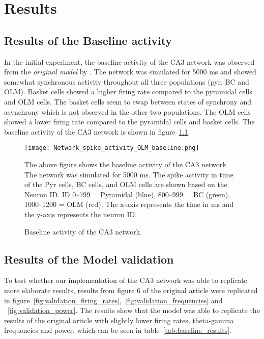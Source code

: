 \chapter{Results}


\section{Results of the Baseline activity}
In the initial experiment, the baseline activity of the CA3 network was
observed from the \textit{original model} by
\textcite{sanjayImpairedDendriticInhibition2015}. The network was simulated for
5000 ms and showed somewhat synchronous activity throughout all three
populations (pyr, BC and OLM). Basket cells showed a higher firing rate
compared to the pyramidal cells and OLM cells. The basket cells seem to swap
between states of synchrony and asynchrony which is not observed in the other
two populations. The OLM cells showed a lower firing rate compared to the
pyramidal cells and basket cells. The baseline activity of the CA3 network is
shown in figure~\ref{fig:baseline_activity}.

\begin{figure}[htbp]
    \centering
    \texttt{[image: Network\_spike\_activity\_OLM\_baseline.png]}
    \caption[Baseline activity of the CA3 network]{Baseline activity of the CA3 network.}\label{fig:baseline_activity}
    \begin{minipage}{0.9\textwidth}
        The above figure shows the baseline activity of the CA3 network. The network was simulated for 5000 ms. The spike activity in time of the Pyr cells, BC cells, and OLM cells are shown based on the Neuron ID\@. ID 0--799 = Pyramidal (blue), 800--999 = BC (green), 1000--1200 = OLM (red). The x-axis represents the time in ms and the y-axis represents the neuron ID\@.
    \end{minipage}
\end{figure}

\section{Results of the Model validation}
To test whether our implementation of the CA3 network was able to replicate
more elaborate results, results from figure 6 of the original
\textcite{sanjayImpairedDendriticInhibition2015} article were replicated in
figure~\ref{fig:validation_firing_rates},~\ref{fig:validation_frequencies} and
~\ref{fig:validation_power}. The results show that the model was able to
replicate the results of the original article with slightly lower firing rates,
theta-gamma frequencies and power, which can be seen in
table~\ref{tab:baseline_results}.

